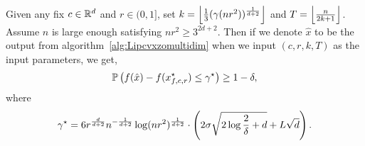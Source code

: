 \begin{corollary}
\label{corollary:zeroth-order-nonsmooth-one-round-multidim}
Given any fix $c \in \mathbb{R}^d$ and $r\in (0, 1]$, set 
$k = \left\lfloor{\frac{1}{3} (\gamma(nr^2))^\frac{1}{d+2}}\right\rfloor$ and 
$T = \left\lfloor{\frac{n}{2k+1}}\right\rfloor$. Assume $n$ is large enough satisfying 
$nr^2 \geq 3^{2{d+2}}$. Then if we denote $\hat{x}$ to be the output 
from algorithm~\ref{alg:Lipcvxzomultidim} when we input 
$(c, r, k, T)$ as the input parameters, we get, 
\begin{equation*}
\mathbb{P}\left(f(\hat{x}) - f(x_{f, c, r}^\star) \leq \gamma^\star \right) \geq 1 - \delta, 
\end{equation*}
where 
\begin{equation*}
\gamma^\star 
	= 6r^\frac{d}{d+2} n^{-\frac{1}{d+2}} \log (nr^2)^\frac{1}{d+2} \cdot 
		\left(2\sigma \sqrt{2\log \frac{2}{\delta} + d} + L\sqrt{d}\right).
\end{equation*}

\end{corollary}

